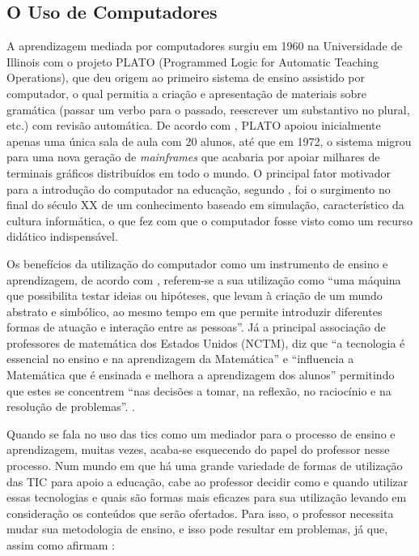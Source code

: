 \subsection{O Uso de Computadores}

A aprendizagem mediada por computadores surgiu em 1960 na Universidade de Illinois com o projeto PLATO (Programmed Logic for Automatic Teaching Operations)\cite{bitzer1961plato}, que deu origem ao primeiro sistema de ensino assistido por computador, o qual permitia a criação e apresentação de materiais sobre gram\'atica (passar um verbo para o passado, reescrever um substantivo no plural, etc.) com revisão automática. De acordo com , PLATO apoiou inicialmente apenas uma única sala de aula com 20 alunos, até que em 1972, o sistema migrou para uma nova geração de \textit{mainframes} que acabaria por apoiar milhares de terminais gráficos distribuídos em todo o mundo. O principal fator motivador para a introdução do computador na educação, segundo , foi o surgimento no final do século XX de um conhecimento baseado em simulação, característico da cultura informática, o que fez com que o computador fosse visto como  um recurso didático  indispensável.

Os benefícios da utilização do computador como um instrumento de ensino e aprendizagem, de acordo com , referem-se a sua utilização como ``uma máquina que 
possibilita testar ideias ou hipóteses, que levam à criação de um mundo abstrato e simbólico, ao mesmo tempo em que permite introduzir diferentes formas de atuação e interação entre as pessoas''. Já a 
principal associação de professores de matemática dos Estados Unidos (NCTM), diz que ``a tecnologia é essencial no ensino e 
na aprendizagem da Matemática'' e ``influencia a Matemática que é ensinada e melhora a aprendizagem dos alunos'' permitindo que estes se concentrem ``nas decisões a tomar, na reflexão, no raciocínio e 
na resolução de problemas''. \cite[p.26]{melo2007principios}.

Quando se fala no uso das \gls{tics} como um mediador para o processo de ensino e aprendizagem, muitas vezes, acaba-se esquecendo do papel do professor nesse 
processo. Num mundo em que há uma grande variedade de formas de utilização das TIC para apoio a educação, cabe ao professor decidir como e quando utilizar essas tecnologias e quais s\~ao formas 
mais eficazes para sua utilização levando em consideração os conteúdos que serão ofertados. Para isso, o professor necessita mudar sua metodologia de ensino, e isso pode resultar em problemas, já 
que, assim como afirmam :

